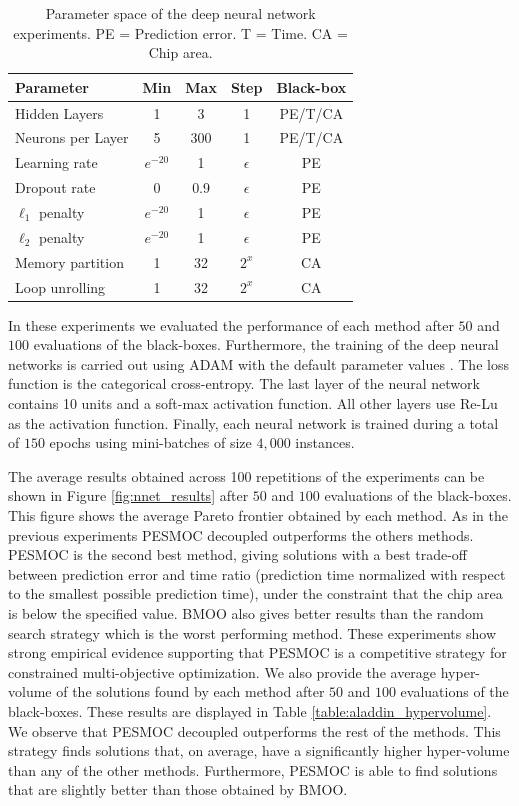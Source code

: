 \documentclass[review,preprint,12pt]{elsarticle}
\begin{document}
\begin{table}[htb]
\centering
\caption{Parameter space of the deep neural network experiments. PE = Prediction error. T = Time. CA = Chip area.}
\begin{tabular}{lcccc}
 \hline
\textbf{Parameter} & \textbf{Min} & \textbf{Max} & \textbf{Step} & \textbf{Black-box} \\
 \hline
Hidden Layers & 1& 3& 1& PE/T/CA\\
Neurons per Layer & 5& 300& 1& PE/T/CA\\
Learning rate & $e^{-20}$& 1& $\epsilon$ & PE\\
Dropout rate & 0& 0.9& $\epsilon$ & PE\\	
$\ell_1$ penalty & $e^{-20}$& 1& $\epsilon$ & PE\\
$\ell_2$ penalty & $e^{-20}$& 1& $\epsilon$ & PE\\
\hline
Memory partition & 1& 32& $2^{x}$& CA\\
Loop unrolling & 1& 32& $2^{x}$& CA\\
\hline
\end{tabular}
\label{table:aladdin}
\end{table}

In these experiments we evaluated the performance of each method after $50$ and $100$ evaluations of the black-boxes.
Furthermore, the training of the deep neural networks is carried out using ADAM with the default parameter values 
\citep{kingma2014adam}. The loss function is the  categorical cross-entropy. The last layer of the 
neural network contains 10 units and a soft-max activation function. All other layers use 
Re-Lu as the activation function. Finally, each neural network is trained during a total of 
$150$ epochs using mini-batches of size $4,000$ instances.

The average results obtained across 100 repetitions of the experiments can be shown in 
Figure \ref{fig:nnet_results} after $50$ and $100$ evaluations of the black-boxes. This 
figure shows the average Pareto frontier obtained by each method. As in the previous experiments 
PESMOC decoupled outperforms the others methods. PESMOC is the second best method, giving 
solutions with a best trade-off between prediction error and time ratio (prediction time normalized with respect
to the smallest possible prediction time), under the constraint that the chip area
is below the specified value. BMOO also gives better results than the random search strategy which 
is the worst performing method. These experiments show strong empirical evidence supporting
that PESMOC is a competitive strategy for constrained multi-objective optimization. 
We also provide the average hyper-volume of the solutions found by each method after $50$ and $100$ evaluations 
of the black-boxes. These results are displayed in Table \ref{table:aladdin_hypervolume}. We observe that PESMOC 
decoupled outperforms the rest of the methods. This strategy finds solutions that, on average, have 
a significantly higher hyper-volume than any of the other methods. Furthermore, PESMOC is 
able to find solutions that are slightly better than those obtained by BMOO.
\end{document}
